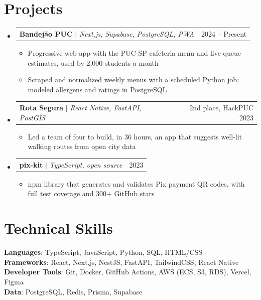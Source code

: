 \documentclass[letterpaper,11pt]{article}
\makeatletter
\newcommand{\resumeItem}[1]{
  \item\small{
    {#1 \vspace{-2pt}}
  }
}
\newcommand{\resumeProjectHeading}[2]{
    \item
    \begin{tabular*}{0.97\textwidth}{l@{\extracolsep{\fill}}r}
      \small#1 & #2 \\
    \end{tabular*}\vspace{-7pt}
}
\newcommand{\resumeSubHeadingListStart}{\begin{itemize}[leftmargin=0.15in, label={}]}
\newcommand{\resumeSubHeadingListEnd}{\end{itemize}}
\newcommand{\resumeItemListStart}{\begin{itemize}}
\newcommand{\resumeItemListEnd}{\end{itemize}\vspace{-5pt}}
\makeatother
\begin{document}
\section{Projects}
    \resumeSubHeadingListStart
      \resumeProjectHeading
          {\textbf{Bandejão PUC} $|$ \emph{Next.js, Supabase, PostgreSQL, PWA}}{2024 -- Present}
          \resumeItemListStart
            \resumeItem{Progressive web app with the PUC-SP cafeteria menu and live queue estimates, used by 2,000 students a month}
            \resumeItem{Scraped and normalized weekly menus with a scheduled Python job; modeled allergens and ratings in PostgreSQL}
          \resumeItemListEnd
      \resumeProjectHeading
          {\textbf{Rota Segura} $|$ \emph{React Native, FastAPI, PostGIS}}{2nd place, HackPUC 2023}
          \resumeItemListStart
            \resumeItem{Led a team of four to build, in 36 hours, an app that suggests well-lit walking routes from open city data}
          \resumeItemListEnd
      \resumeProjectHeading
          {\textbf{pix-kit} $|$ \emph{TypeScript, open source}}{2023}
          \resumeItemListStart
            \resumeItem{npm library that generates and validates Pix payment QR codes, with full test coverage and 300+ GitHub stars}
          \resumeItemListEnd
    \resumeSubHeadingListEnd

\section{Technical Skills}
 \begin{itemize}[leftmargin=0.15in, label={}]
    \small{\item{
     \textbf{Languages}{: TypeScript, JavaScript, Python, SQL, HTML/CSS} \\
     \textbf{Frameworks}{: React, Next.js, NestJS, FastAPI, TailwindCSS, React Native} \\
     \textbf{Developer Tools}{: Git, Docker, GitHub Actions, AWS (ECS, S3, RDS), Vercel, Figma} \\
     \textbf{Data}{: PostgreSQL, Redis, Prisma, Supabase}
    }}
 \end{itemize}
\end{document}
